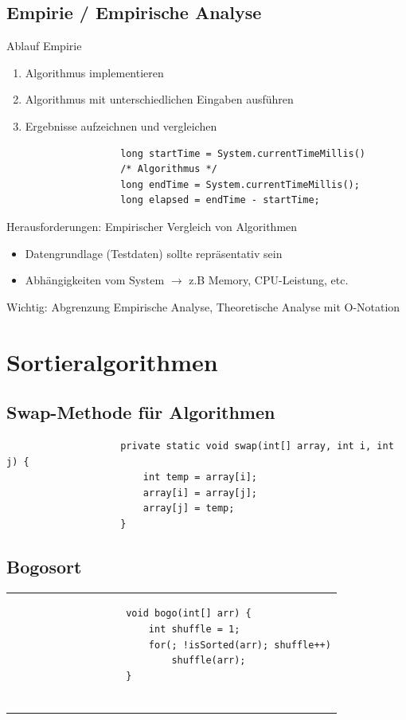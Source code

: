 \documentclass[a4paper, landscape, 8pt]{scrartcl}
\begin{document}
\begin{multicols*}{4}
            \subsection{Empirie / Empirische Analyse}
                \textcolor{subsectioncolor}{Ablauf Empirie}
                \begin{enumerate}
                    \item Algorithmus implementieren
                    \item Algorithmus mit unterschiedlichen Eingaben ausführen
                    \item Ergebnisse aufzeichnen und vergleichen
                \end{enumerate}
                \begin{lstlisting}
                    long startTime = System.currentTimeMillis()
                    /* Algorithmus */
                    long endTime = System.currentTimeMillis();
                    long elapsed = endTime - startTime;
                \end{lstlisting}
                \textcolor{subsectioncolor}{Herausforderungen: Empirischer Vergleich von Algorithmen}
                \begin{itemize}
                    \item Datengrundlage (Testdaten) sollte repräsentativ sein
                    \item Abhängigkeiten vom System $\to$ z.B Memory, CPU-Leistung, etc.
                \end{itemize}

                Wichtig: Abgrenzung Empirische Analyse, Theoretische Analyse mit O-Notation
        \columnbreak
        \section{Sortieralgorithmen}
            \subsection{Swap-Methode für Algorithmen}
            \begin{lstlisting}
                    private static void swap(int[] array, int i, int j) {
                        int temp = array[i];
                        array[i] = array[j];
                        array[j] = temp;
                    }
            \end{lstlisting}
            \subsection{Bogosort}
                \begin{tabular}{|l|}
                    \hline
                    \begin{lstlisting}
                    void bogo(int[] arr) {
                        int shuffle = 1;
                        for(; !isSorted(arr); shuffle++)
                            shuffle(arr);
                    }


\end{lstlisting}
\end{tabular}
\end{multicols*}
\end{document}
